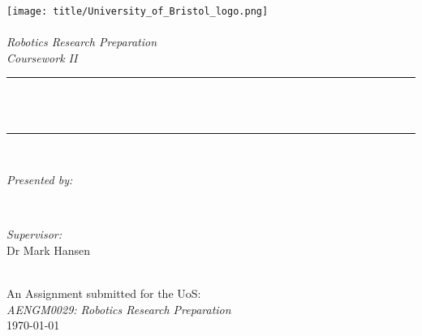 \begin{titlepage}
\newcommand{\HRule}{\rule{\linewidth}{0.5mm}}
\texttt{[image: title/University\_of\_Bristol\_logo.png]}\\
[1cm] 
\center 
\quad\\[1.5cm]
\textsl{\Large Robotics Research Preparation}\\[0.5cm] 
\textsl{\large Coursework II}\\[0.5cm] 
\makeatletter
\HRule \\[0.4cm]
{ \huge \bfseries \@title}\\[0.4cm] 
\HRule \\[1.5cm]
\begin{minipage}{0.4\textwidth}
\begin{flushleft} \large
\emph{Presented by:}\\
\@author 
\end{flushleft}
\end{minipage}
~
\begin{minipage}{0.4\textwidth}
\begin{flushright} \large
\emph{Supervisor:} \\
\textup{Dr Mark Hansen}
\end{flushright}
\end{minipage}\\[3cm]
\makeatother
{\large An Assignment submitted for the UoS:}\\[0.5cm]
{\large \emph{AENGM0029: Robotics Research Preparation}}\\[0.5cm]
{\large \today}\\[2cm] 
\vfill 
\end{titlepage}